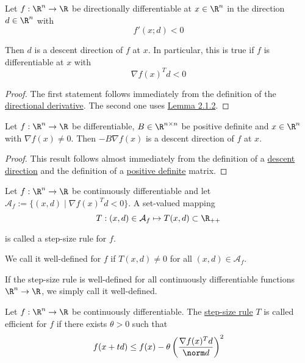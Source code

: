 \label{f81d53c}

Let $f:\R^n\to\R$ be directionally differentiable at $x\in\R^n$ in the
direction $d\in\R^n$ with
$$
	f'(x;d)<0
$$

Then $d$ is a descent direction of $f$ at $x$. In particular, this is
true if $f$ is differentiable at $x$ with
$$
	\nabla f(x)^Td<0
$$

\begin{proof}
	The first statement follows immediately from the definition of the
	\href{37eb747}{directional derivative}. The second one uses
	\href{ed67d29}{Lemma 2.1.2}.
\end{proof}

\label{c41d0f0}

Let $f:\R^n\to\R$ be differentiable, $B\in\R^{n\times n}$ be positive
definite and $x\in\R^n$ with $\nabla f(x)\neq0$. Then $-B\nabla f(x)$
is a descent direction of $f$ at $x$.

\begin{proof}
	This result follows almost immediately from the definition of a
	\href{37eb747}{descent direction} and the definition of a
	\href{e25e722}{positive definite} matrix.
\end{proof}

\label{ae4eac6}

Let $f:{\R}^n\to{\R}$ be continuously differentiable and
let $\mathcal A_f:=\{(x,d)\mid\nabla f(x)^Td<0\}$. A set-valued
mapping
$$
	T:(x,d)\in\mathcal A_f\mapsto T(x,d)\subset\R_{++}
$$

is called a step-size rule for $f$.

We call it well-defined for $f$ if $T(x,d)\neq0$ for all
$(x,d)\in\mathcal{A}_f$.

If the step-size rule is well-defined for all continuously
differentiable functions ${\R}^n\to{\R}$, we simply call it
well-defined.

\label{d23fdf0}

Let $f:\R^n\to\R$ be continuously differentiable. The
\href{ae4eac6}{step-size rule} $T$ is called efficient for $f$ if
there exists $\theta>0$ such that
$$
	f(x+td)\leq f(x)-\theta\left(\frac{\nabla f(x)^Td}{\norm d}\right)^2
$$


